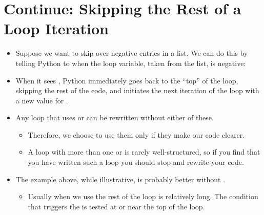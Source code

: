 \documentclass[letterpaper,10pt,english]{sphinxmanual}
\begin{document}
\section{Continue: Skipping the Rest of a Loop Iteration}
\label{\detokenize{lecture_notes/lec12_loops2_for_double:continue-skipping-the-rest-of-a-loop-iteration}}\begin{itemize}
\item {} 
Suppose we want to skip over negative entries in a list. We can do
this by telling Python to  when the loop variable,
taken from the list, is negative:

\begin{sphinxVerbatim}[commandchars=\\\{\}]
   
       
\end{sphinxVerbatim}

\item {} 
When it sees , Python immediately goes back to the “top”
of the loop, skipping the rest of the code, and initiates the next
iteration of the loop with a new value for .

\item {} 
Any loop that uses  or  can be rewritten
without either of these.
\begin{itemize}
\item {} 
Therefore, we choose to use them only if they make our code
clearer.

\item {} 
A loop with more than one  or  is rarely
well-structured, so if you find that you have written such a
loop you should stop and rewrite your code.

\end{itemize}

\item {} 
The example above, while illustrative, is probably better without
.
\begin{itemize}
\item {} 
Usually when we use  the rest of the loop is
relatively long. The condition that triggers the  is
tested at or near the top of the loop.


\end{itemize}
\end{itemize}
\end{document}
